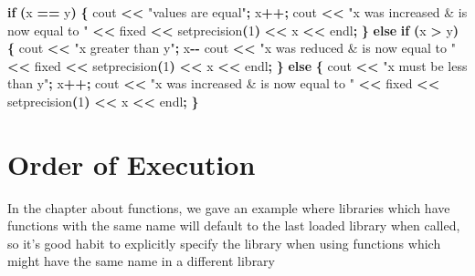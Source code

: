 \documentclass[
]{book}
\newenvironment{Shaded}{\begin{snugshade}}{\end{snugshade}}
\newcommand{\ControlFlowTok}[1]{\textcolor[rgb]{0.13,0.29,0.53}{\textbf{#1}}}
\newcommand{\DecValTok}[1]{\textcolor[rgb]{0.00,0.00,0.81}{#1}}
\newcommand{\NormalTok}[1]{#1}
\newcommand{\OperatorTok}[1]{\textcolor[rgb]{0.81,0.36,0.00}{\textbf{#1}}}
\newcommand{\StringTok}[1]{\textcolor[rgb]{0.31,0.60,0.02}{#1}}
\begin{document}
\begin{Shaded}
\begin{Highlighting}[]
\ControlFlowTok{if} \OperatorTok{(}\NormalTok{x }\OperatorTok{==}\NormalTok{ y}\OperatorTok{)} \OperatorTok{\{}
\NormalTok{  cout }\OperatorTok{\textless{}\textless{}} \StringTok{"values are equal"}\OperatorTok{;}
\NormalTok{  x}\OperatorTok{++;}
\NormalTok{  cout }\OperatorTok{\textless{}\textless{}} \StringTok{"x was increased \& is now equal to "} \OperatorTok{\textless{}\textless{}}\NormalTok{ fixed }\OperatorTok{\textless{}\textless{}}\NormalTok{ setprecision}\OperatorTok{(}\DecValTok{1}\OperatorTok{)} \OperatorTok{\textless{}\textless{}}\NormalTok{ x }\OperatorTok{\textless{}\textless{}}\NormalTok{ endl}\OperatorTok{;}
\OperatorTok{\}} \ControlFlowTok{else} \ControlFlowTok{if} \OperatorTok{(}\NormalTok{x }\OperatorTok{\textgreater{}}\NormalTok{ y}\OperatorTok{)} \OperatorTok{\{}
\NormalTok{  cout }\OperatorTok{\textless{}\textless{}} \StringTok{"x greater than y"}\OperatorTok{;}
\NormalTok{  x}\OperatorTok{{-}{-}}
\NormalTok{  cout }\OperatorTok{\textless{}\textless{}} \StringTok{"x was reduced \& is now equal to "} \OperatorTok{\textless{}\textless{}}\NormalTok{ fixed }\OperatorTok{\textless{}\textless{}}\NormalTok{ setprecision}\OperatorTok{(}\DecValTok{1}\OperatorTok{)} \OperatorTok{\textless{}\textless{}}\NormalTok{ x }\OperatorTok{\textless{}\textless{}}\NormalTok{ endl}\OperatorTok{;}
\OperatorTok{\}} \ControlFlowTok{else} \OperatorTok{\{}
\NormalTok{  cout }\OperatorTok{\textless{}\textless{}} \StringTok{"x must be less than y"}\OperatorTok{;}
\NormalTok{  x}\OperatorTok{++;}
\NormalTok{  cout }\OperatorTok{\textless{}\textless{}} \StringTok{"x was increased \& is now equal to "} \OperatorTok{\textless{}\textless{}}\NormalTok{ fixed }\OperatorTok{\textless{}\textless{}}\NormalTok{ setprecision}\OperatorTok{(}\DecValTok{1}\OperatorTok{)} \OperatorTok{\textless{}\textless{}}\NormalTok{ x }\OperatorTok{\textless{}\textless{}}\NormalTok{ endl}\OperatorTok{;}
\OperatorTok{\}}
\end{Highlighting}
\end{Shaded}

\section{Order of Execution}\label{order-of-execution}

In the chapter about functions, we gave an example where libraries which have
functions with the same name will default to the last loaded library when called,
so it's good habit to explicitly specify the library when using functions which
might have the same name in a different library
\end{document}
